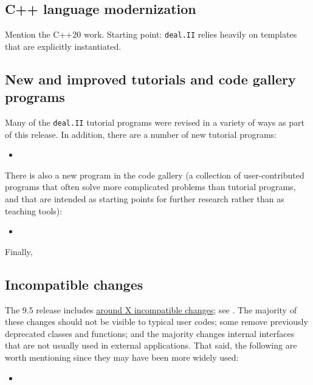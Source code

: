 \documentclass{ansarticle-preprint}
\newcommand{\specialword}[1]{\texttt{#1}}
\newcommand{\dealii}{{\specialword{deal.II}}\xspace}
\begin{document}
\subsection{C++ language modernization}\label{sec:language}

Mention the C++20 work. Starting point: \dealii{} relies heavily on
templates that are explicitly instantiated.


\subsection{New and improved tutorials and code gallery programs}
\label{subsec:steps}

Many of the \dealii tutorial programs were revised in a variety of ways
as part of this release. In addition, there are a number of new tutorial
programs:
\begin{itemize}
  \item
\end{itemize}

There is also a new program in the code gallery (a collection of
user-contributed programs that often solve more complicated problems
than tutorial programs, and that are intended as starting points for further
research rather than as teaching tools):
\begin{itemize}
  \item 
\end{itemize}
Finally, 



\subsection{Incompatible changes}\label{subsec:deprecated}

The 9.5 release includes
\href{https://dealii.org/developer/doxygen/deal.II/changes_between_9_4_2_and_9_5_0.html}
{around X incompatible changes}; see \cite{changes95}. The majority of these changes
should not be visible to typical user codes; some remove previously
deprecated classes and functions; and the majority changes internal
interfaces that are not usually used in external
applications. That said, the following are worth mentioning since they
may have been more widely used:
\begin{itemize}
  \item 
\end{itemize}
\end{document}
